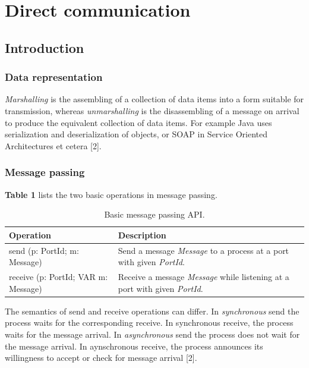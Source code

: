 \chapter{Direct communication}

\section{Introduction}


\subsection{Data representation}

\emph{Marshalling} is the assembling of a collection of data items into a form suitable for transmission, whereas \emph{unmarshalling} is the disassembling of a message on arrival to produce the equivalent collection of data items. For example Java uses serialization and deserialization of objects, or SOAP in Service Oriented Architectures et cetera [2].


\subsection{Message passing}

\textbf{Table 1} lists the two basic operations in message passing.

\begin{table}
	\caption{Basic message passing API.}
	\label{tab:}
	\begin{tabular}{p{150px} | p{250px}}
		\textbf{Operation} & \textbf{Description} \\
		\hline
		send (p: PortId; m: Message) & Send a message \emph{Message} to a process at a port with given \emph{PortId}. \\
		receive (p: PortId; VAR m: Message) & Receive a message \emph{Message} while listening at a port with given \emph{PortId}. \\
		\hline
	\end{tabular}
\end{table}


The semantics of send and receive operations can differ. In \emph{synchronous} send the process waits for the corresponding receive. In synchronous receive, the process waits for the message arrival. In \emph{asynchronous} send the process does not wait for the message arrival. In aynschronous receive, the process announces its willingness to accept or check for message arrival [2].

